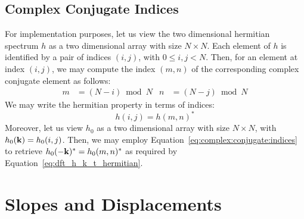 \subsection{Complex Conjugate Indices}
%
For implementation purposes, let us view the two dimensional hermitian spectrum $h$
as a two dimensional array with size $N \times N$.
Each element of $h$ is identified by a pair of indices $(i,j)$, with $0\leq i,j <N$. Then, for
an element at index $(i,j)$, we may compute the index $(m,n)$ of the corresponding complex
conjugate element as follows:
\begin{align}
\label{eq:complex:conjugate:indices}
m &= (N - i)\bmod N & n &= (N - j)\bmod N
\end{align}
We may write the hermitian property in terms of indices:
\begin{equation*}
 h(i,j) = h(m,n)^*
\end{equation*}
%
Moreover, let us view $h_0$ as a two dimensional array with size $N \times N$,
with $h_0(\mathbf{k}) = h_0(i,j)$. Then, we may employ Equation~\ref{eq:complex:conjugate:indices}
to retrieve $h_0(-\mathbf{k})^*=h_0(m,n)^*$ as required by
Equation~\ref{eq:dft_h_k_t_hermitian}.
%

%

%
\section{Slopes and Displacements}
\label{sec:slopes_and_displacements}
